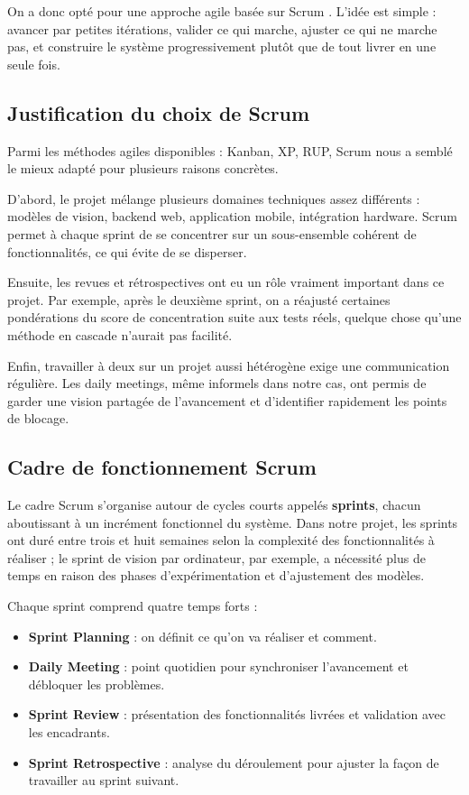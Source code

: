 On a donc opté pour une approche agile \cite{agilemanifesto} basée sur Scrum \cite{scrumguide}. L’idée est simple : avancer par petites itérations, valider ce qui marche, ajuster ce qui ne marche pas, et construire le système progressivement plutôt que de tout livrer en une seule fois.

\subsection{Justification du choix de Scrum}

Parmi les méthodes agiles disponibles : Kanban, XP, \ac{RUP}, Scrum \cite{scrumguide} nous a semblé le mieux adapté pour plusieurs raisons concrètes.

D’abord, le projet mélange plusieurs domaines techniques assez différents : modèles de vision, backend web, application mobile, intégration hardware. Scrum permet à chaque sprint de se concentrer sur un sous-ensemble cohérent de fonctionnalités, ce qui évite de se disperser.

Ensuite, les revues et rétrospectives ont eu un rôle vraiment important dans ce projet. Par exemple, après le deuxième sprint, on a réajusté certaines pondérations du score de concentration suite aux tests réels, quelque chose qu’une méthode en cascade n’aurait pas facilité.

Enfin, travailler à deux sur un projet aussi hétérogène exige une communication régulière. Les daily meetings, même informels dans notre cas, ont permis de garder une vision partagée de l’avancement et d’identifier rapidement les points de blocage.

\subsection{Cadre de fonctionnement Scrum}

Le cadre Scrum \cite{scrumguide} s’organise autour de cycles courts appelés \textbf{sprints}, chacun aboutissant à un incrément fonctionnel du système. Dans notre projet, les sprints ont duré entre trois et huit semaines selon la complexité des fonctionnalités à réaliser ; le sprint de vision par ordinateur, par exemple, a nécessité plus de temps en raison des phases d’expérimentation et d’ajustement des modèles.

Chaque sprint comprend quatre temps forts :

\begin{itemize}
    \item \textbf{Sprint Planning} : on définit ce qu’on va réaliser et comment.
    \item \textbf{Daily Meeting} : point quotidien pour synchroniser l’avancement et débloquer les problèmes.
    \item \textbf{Sprint Review} : présentation des fonctionnalités livrées et validation avec les encadrants.
    \item \textbf{Sprint Retrospective} : analyse du déroulement pour ajuster la façon de travailler au sprint suivant.
\end{itemize}

